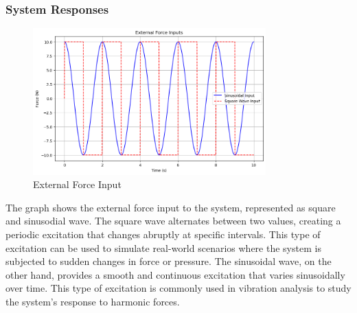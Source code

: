 \documentclass[12pt,a4paper]{article}
\begin{document}
\subsubsection{System Responses}
\begin{figure}[H]
    \centering
    \includegraphics[width=0.8\textwidth]{force_input.png} 
    \caption{External Force Input}
    \label{fig:system}
\end{figure}
{\vspace{10pt}}

The graph shows the external force input to the system, represented as square and sinusodial wave. The square wave alternates between two values, creating a periodic excitation that changes abruptly at specific intervals. This type of excitation can be used to simulate real-world scenarios where the system is subjected to sudden changes in force or pressure. The sinusoidal wave, on the other hand, provides a smooth and continuous excitation that varies sinusoidally over time. This type of excitation is commonly used in vibration analysis to study the system's response to harmonic forces.


{\vspace{10pt}}
\end{document}
